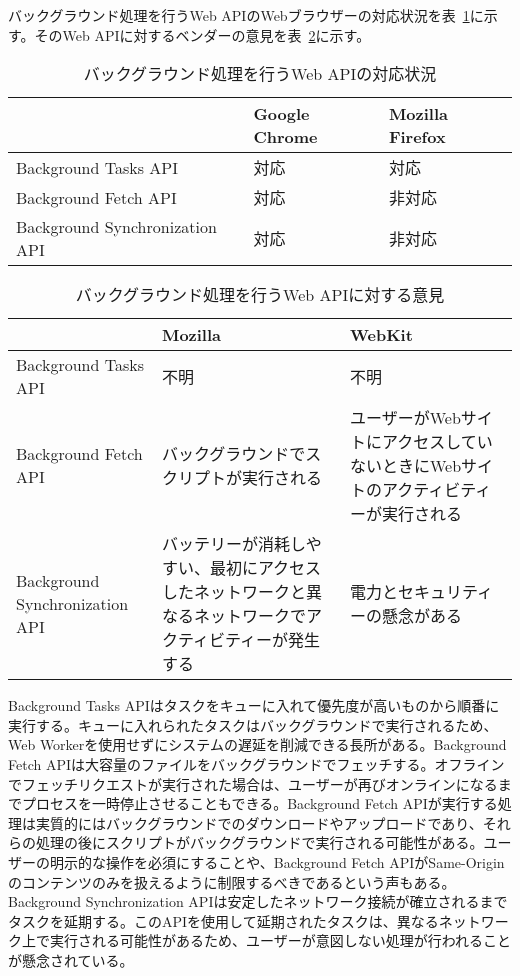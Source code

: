 バックグラウンド処理を行うWeb APIのWebブラウザーの対応状況を表~\ref{table:バックグラウンド処理を行うWeb APIの対応状況}に示す。そのWeb APIに対するベンダーの意見を表~\ref{table:バックグラウンド処理を行うWeb APIに対する意見}に示す。
\begin{table}
  \caption{バックグラウンド処理を行うWeb APIの対応状況}\label{table:バックグラウンド処理を行うWeb APIの対応状況}
  \centering
  \begin{tabular}{|p{13em}|p{8em}|p{8em}|}
    \hline
    & Google Chrome & Mozilla Firefox \\ \hline
    Background Tasks API & \cellcolor{green!25}対応 & \cellcolor{green!25}対応 \\ \hline
    Background Fetch API & \cellcolor{green!25}対応 & \cellcolor{red!25}非対応 \\ \hline
    Background Synchronization API & \cellcolor{green!25}対応 & \cellcolor{red!25}非対応 \\ \hline
  \end{tabular}
\end{table}
\begin{table}
  \caption{バックグラウンド処理を行うWeb APIに対する意見}
  \label{table:バックグラウンド処理を行うWeb APIに対する意見}
    \centering
    \begin{tabular}{|p{13em}|p{13em}|p{13em}|}
        \hline
        & Mozilla & WebKit \\ \hline
        Background Tasks API & 不明 & 不明 \\ \hline
        Background Fetch API & \cellcolor{red!25}バックグラウンドでスクリプトが実行される~\cite{MozillaBackgroundFetchAPI} & \cellcolor{red!25}ユーザーがWebサイトにアクセスしていないときにWebサイトのアクティビティーが実行される~\cite{WebKitBackgroundFetchAPI} \\ \hline
        Background Synchronization API & \cellcolor{red!25}バッテリーが消耗しやすい、最初にアクセスしたネットワークと異なるネットワークでアクティビティーが発生する~\cite{MozillaBackgroundSynchronizationAPI} & \cellcolor{red!25}電力とセキュリティーの懸念がある \\ \hline
    \end{tabular}
\end{table}
Background Tasks APIはタスクをキューに入れて優先度が高いものから順番に実行する。キューに入れられたタスクはバックグラウンドで実行されるため、Web Workerを使用せずにシステムの遅延を削減できる長所がある。Background Fetch APIは大容量のファイルをバックグラウンドでフェッチする。オフラインでフェッチリクエストが実行された場合は、ユーザーが再びオンラインになるまでプロセスを一時停止させることもできる。Background Fetch APIが実行する処理は実質的にはバックグラウンドでのダウンロードやアップロードであり、それらの処理の後にスクリプトがバックグラウンドで実行される可能性がある。ユーザーの明示的な操作を必須にすることや、Background Fetch APIがSame-Originのコンテンツのみを扱えるように制限するべきであるという声もある。Background Synchronization APIは安定したネットワーク接続が確立されるまでタスクを延期する。このAPIを使用して延期されたタスクは、異なるネットワーク上で実行される可能性があるため、ユーザーが意図しない処理が行われることが懸念されている。

